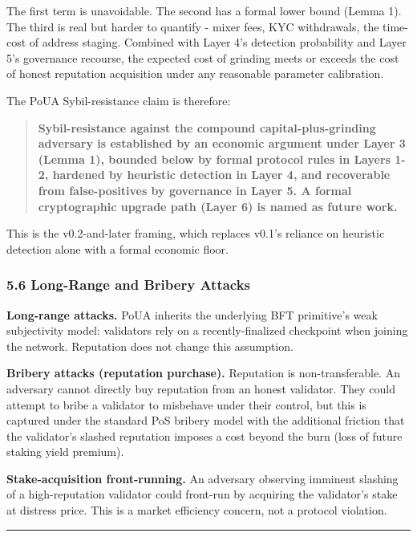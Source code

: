 \documentclass[
  11pt,
]{article}
\begin{document}
The first term is unavoidable. The second has a formal lower bound
(Lemma 1). The third is real but harder to quantify - mixer fees, KYC
withdrawals, the time-cost of address staging. Combined with Layer 4's
detection probability and Layer 5's governance recourse, the expected
cost of grinding meets or exceeds the cost of honest reputation
acquisition under any reasonable parameter calibration.

The PoUA Sybil-resistance claim is therefore:

\begin{quote}
\textbf{Sybil-resistance against the compound capital-plus-grinding
adversary is established by an economic argument under Layer 3 (Lemma
1), bounded below by formal protocol rules in Layers 1-2, hardened by
heuristic detection in Layer 4, and recoverable from false-positives by
governance in Layer 5. A formal cryptographic upgrade path (Layer 6) is
named as future work.}
\end{quote}

This is the v0.2-and-later framing, which replaces v0.1's reliance on
heuristic detection alone with a formal economic floor.

\subsubsection{5.6 Long-Range and Bribery
Attacks}\label{long-range-and-bribery-attacks}

\textbf{Long-range attacks.} PoUA inherits the underlying BFT
primitive's weak subjectivity model: validators rely on a
recently-finalized checkpoint when joining the network. Reputation does
not change this assumption.

\textbf{Bribery attacks (reputation purchase).} Reputation is
non-transferable. An adversary cannot directly buy reputation from an
honest validator. They could attempt to bribe a validator to misbehave
under their control, but this is captured under the standard PoS bribery
model with the additional friction that the validator's slashed
reputation imposes a cost beyond the burn (loss of future staking yield
premium).

\textbf{Stake-acquisition front-running.} An adversary observing
imminent slashing of a high-reputation validator could front-run by
acquiring the validator's stake at distress price. This is a market
efficiency concern, not a protocol violation.

\begin{center}\rule{0.5\linewidth}{0.5pt}\end{center}
\end{document}
